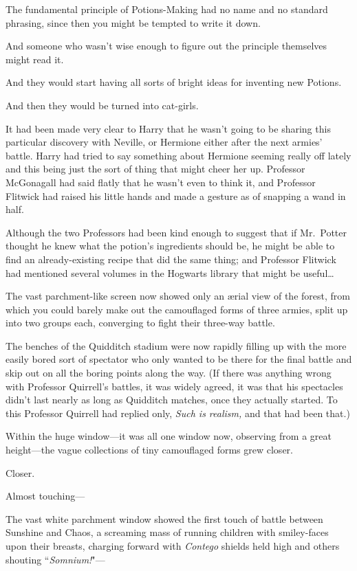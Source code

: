 The fundamental principle of Potions-Making had no name and no standard phrasing, since then you might be tempted to write it down.

And someone who wasn't wise enough to figure out the principle themselves might read it.

And they would start having all sorts of bright ideas for inventing new Potions.

And then they would be turned into cat-girls.

It had been made very clear to Harry that he wasn't going to be sharing this particular discovery with Neville, or Hermione either after the next armies' battle. Harry had tried to say something about Hermione seeming really off lately and this being just the sort of thing that might cheer her up. Professor McGonagall had said flatly that he wasn't even to think it, and Professor Flitwick had raised his little hands and made a gesture as of snapping a wand in half.

Although the two Professors had been kind enough to suggest that if Mr.~Potter thought he knew what the potion's ingredients should be, he might be able to find an already-existing recipe that did the same thing; and Professor Flitwick had mentioned several volumes in the Hogwarts library that might be useful{\ldots}

\later

The vast parchment-like screen now showed only an ærial view of the forest, from which you could barely make out the camouflaged forms of three armies, split up into two groups each, converging to fight their three-way battle.

The benches of the Quidditch stadium were now rapidly filling up with the more easily bored sort of spectator who only wanted to be there for the final battle and skip out on all the boring points along the way. (If there was anything wrong with Professor Quirrell's battles, it was widely agreed, it was that his spectacles didn't last nearly as long as Quidditch matches, once they actually started. To this Professor Quirrell had replied only, \emph{Such is realism,} and that had been that.)

Within the huge window—it was all one window now, observing from a great height—the vague collections of tiny camouflaged forms grew closer.

Closer.

Almost touching—

\later

The vast white parchment window showed the first touch of battle between Sunshine and Chaos, a screaming mass of running children with smiley-faces upon their breasts, charging forward with \emph{Contego} shields held high and others shouting ``\emph{Somnium!}"—

